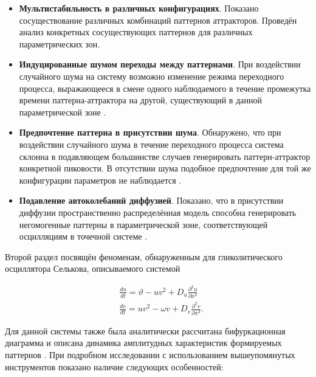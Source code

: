 \begin{itemize}
    \item \textbf{Мультистабильность в различных конфигурациях}. Показано сосуществование различных комбинаций паттернов аттракторов. Проведён анализ конкретных сосуществующих паттернов для различных параметрических зон.
    \item \textbf{Индуцированные шумом переходы между паттернами}. При воздействии случайного шума на систему возможно изменение режима переходного процесса, выражающееся в смене одного наблюдаемого в течение промежутка времени паттерна-аттрактора на другой, существующий в данной параметрической зоне \cite{bib1}.
    \item \textbf{Предпочтение паттерна в присутствии шума}. Обнаружено, что при воздействии случайного шума в течение переходного процесса система склонна в подавляющем большинстве случаев генерировать паттерн-аттрактор конкретной пиковости. В отсутствии шума подобное предпочтение для той же конфигурации параметров не наблюдается \cite{bib1}.
    \item \textbf{Подавление автоколебаний диффузией}. Показано, что в присутствии диффузии пространственно распределённая модель способна генерировать негомогенные паттерны в параметрической зоне, соответствующей осцилляциям в точечной системе \cite{bib2}.
\end{itemize}

Второй раздел посвящён феноменам, обнаруженным для гликолитического осциллятора Селькова, описываемого системой

\begin{equation}
    \begin{aligned}
        & \frac{d u}{d t}=\vartheta-u v^2+D_u \frac{\partial^2 u}{\partial x^2} \\
        & \frac{d v}{d t}=u v^2-\omega v+D_v \frac{\partial^2 v}{\partial x^2}.
        \end{aligned}
\end{equation}

Для данной системы также была аналитически рассчитана бифуркационная диаграмма и описана динамика амплитудных характеристик формируемых паттернов \cite{bib3}. При подробном исследовании с использованием вышеупомянутых инструментов показано наличие следующих особенностей:


